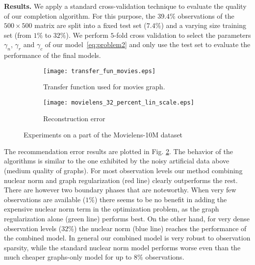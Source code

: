 \documentclass{article}
\begin{document}
{\bf Results. }
We apply a standard cross-validation technique to evaluate the quality of our completion algorithm. For this purpose, the $39.4\%$ observations of the $500\times 500$ matrix are split into a fixed test set ($7.4\%$) and a varying size training set (from $1\%$ to $32\%$). We perform $5$-fold cross validation to select the parameters $\gamma_n$, $\gamma_r$ and $\gamma_c$ of our model~\eqref{eq:problem2} and only use the test set to evaluate the performance of the final models.
\begin{figure}
        \begin{subfigure}[b]{.5\linewidth}
            \centering \texttt{[image: transfer\_fun\_movies.eps]}
            \caption{Transfer function used for movies graph.}\label{fig:transfer_fun_movies}
          \end{subfigure}
          \begin{subfigure}[b]{.5\linewidth}
\centering\texttt{[image: movielens\_32\_percent\_lin\_scale.eps]}
            \caption{Reconstruction error}\label{fig:real_final}
          \end{subfigure}
         \caption{Experiments on a part of the Movielens-10M dataset}\label{fig:data_real}
	\vspace{-0.25cm}
\end{figure}
The recommendation error results are plotted in Fig. \ref{fig:real_final}. 
The behavior of the algorithms is similar to the one exhibited by the noisy artificial data above (medium quality of graphs). For most observation levels our method combining nuclear norm and graph regularization (red line) clearly outperforms the rest. There are however two boundary phases that are noteworthy. When very few observations are available ($1\%$) there seems to be no benefit in adding the expensive nuclear norm term in the optimization problem, as the graph regularization alone (green line) performs best. On the other hand, for very dense observation levels ($32\%$) the nuclear norm (blue line) reaches the performance of the combined model. In general our combined model is very robust to observation sparsity, while the standard nuclear norm model performs worse even than the much cheaper graphs-only model for up to $8\%$ observations.
\end{document}

